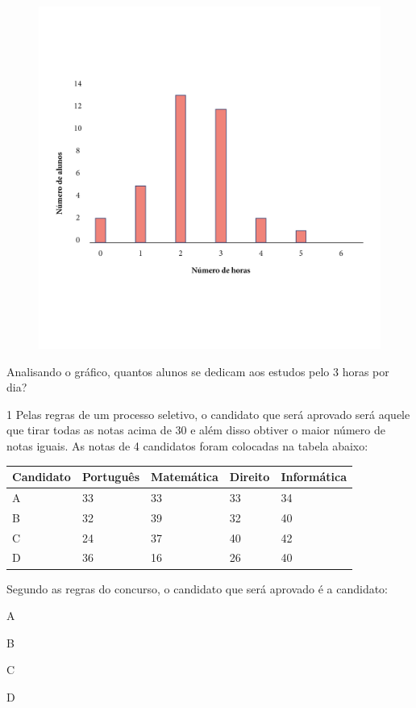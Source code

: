 \begin{figure}[htpb!]
\includegraphics[width=\textwidth]{../ilustracoes/MAT5/SAEB_5ANO_MAT_figura109.png}
\end{figure}

Analisando o gráfico, quantos alunos se dedicam aos estudos pelo 3 horas
por dia?




\num{1} Pelas regras de um processo seletivo, o candidato que será aprovado
será aquele que tirar todas as notas acima de 30 e além disso obtiver o
maior número de notas iguais. As notas de 4 candidatos foram colocadas
na tabela abaixo:

\begin{longtable}[]{@{}lllll@{}}
\toprule
Candidato & Português & Matemática & Direito &
Informática\tabularnewline
\midrule
\endhead
A & 33 & 33 & 33 & 34\tabularnewline
B & 32 & 39 & 32 & 40\tabularnewline
C & 24 & 37 & 40 & 42\tabularnewline
D & 36 & 16 & 26 & 40\tabularnewline
\bottomrule
\end{longtable}

Segundo as regras do concurso, o candidato que será aprovado é a
candidato:

\begin{escolha}
\item
  A
\item
  B
\item
  C
\item
  D
\end{escolha}

